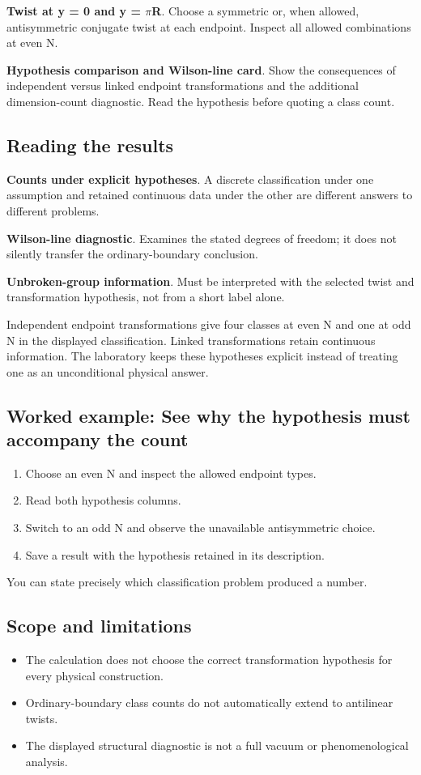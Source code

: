 \documentclass[11pt,a4paper]{article}
\begin{document}
\textbf{Twist at y = 0 and y = \ensuremath{\pi}R}. Choose a symmetric or, when allowed, antisymmetric conjugate twist at each endpoint. Inspect all allowed combinations at even N.

\textbf{Hypothesis comparison and Wilson-line card}. Show the consequences of independent versus linked endpoint transformations and the additional dimension-count diagnostic. Read the hypothesis before quoting a class count.

\subsection*{Reading the results}
\textbf{Counts under explicit hypotheses}. A discrete classification under one assumption and retained continuous data under the other are different answers to different problems.

\textbf{Wilson-line diagnostic}. Examines the stated degrees of freedom; it does not silently transfer the ordinary-boundary conclusion.

\textbf{Unbroken-group information}. Must be interpreted with the selected twist and transformation hypothesis, not from a short label alone.

Independent endpoint transformations give four classes at even N and one at odd N in the displayed classification. Linked transformations retain continuous information. The laboratory keeps these hypotheses explicit instead of treating one as an unconditional physical answer.
\subsection*{Worked example: See why the hypothesis must accompany the count}
\begin{enumerate}
\item Choose an even N and inspect the allowed endpoint types.
\item Read both hypothesis columns.
\item Switch to an odd N and observe the unavailable antisymmetric choice.
\item Save a result with the hypothesis retained in its description.
\end{enumerate}
You can state precisely which classification problem produced a number.
\subsection*{Scope and limitations}
\begin{itemize}
\item The calculation does not choose the correct transformation hypothesis for every physical construction.
\item Ordinary-boundary class counts do not automatically extend to antilinear twists.
\item The displayed structural diagnostic is not a full vacuum or phenomenological analysis.
\end{itemize}
\end{document}
